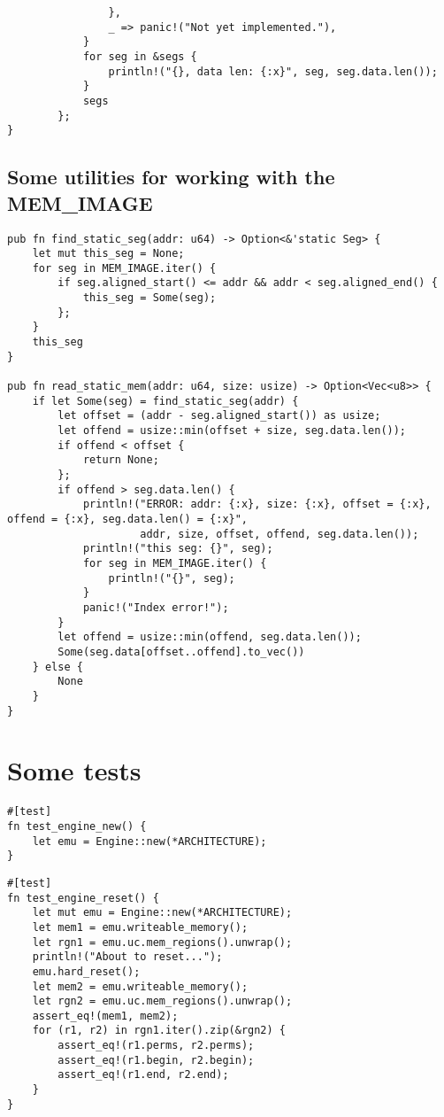 \documentclass[11pt]{article}
\begin{document}
\begin{lstlisting}
                },
                _ => panic!("Not yet implemented."),
            }
            for seg in &segs {
                println!("{}, data len: {:x}", seg, seg.data.len());
            }
            segs
        };
}
\end{lstlisting}

\subsection{Some utilities for working with the MEM\_IMAGE}
\label{sec:org6a36211}

\lstset{language=rust,label=orgfd2f05d,caption= ,captionpos=b,numbers=none}
\begin{lstlisting}
pub fn find_static_seg(addr: u64) -> Option<&'static Seg> {
    let mut this_seg = None;
    for seg in MEM_IMAGE.iter() {
        if seg.aligned_start() <= addr && addr < seg.aligned_end() {
            this_seg = Some(seg);
        };
    }
    this_seg
}

pub fn read_static_mem(addr: u64, size: usize) -> Option<Vec<u8>> {
    if let Some(seg) = find_static_seg(addr) {
        let offset = (addr - seg.aligned_start()) as usize;
        let offend = usize::min(offset + size, seg.data.len());
        if offend < offset {
            return None;
        };
        if offend > seg.data.len() {
            println!("ERROR: addr: {:x}, size: {:x}, offset = {:x}, offend = {:x}, seg.data.len() = {:x}",
                     addr, size, offset, offend, seg.data.len());
            println!("this seg: {}", seg);
            for seg in MEM_IMAGE.iter() {
                println!("{}", seg);
            }
            panic!("Index error!");
        }
        let offend = usize::min(offend, seg.data.len());
        Some(seg.data[offset..offend].to_vec())
    } else {
        None
    }
}
\end{lstlisting}

\section{Some tests}
\label{sec:org5b9c8f5}
\lstset{language=rust,label=orgae880f1,caption= ,captionpos=b,numbers=none}
\begin{lstlisting}
#[test]
fn test_engine_new() {
    let emu = Engine::new(*ARCHITECTURE);
}
\end{lstlisting}


\lstset{language=rust,label=org0f2de97,caption= ,captionpos=b,numbers=none}
\begin{lstlisting}
#[test]
fn test_engine_reset() {
    let mut emu = Engine::new(*ARCHITECTURE);
    let mem1 = emu.writeable_memory();
    let rgn1 = emu.uc.mem_regions().unwrap();
    println!("About to reset...");
    emu.hard_reset();
    let mem2 = emu.writeable_memory();
    let rgn2 = emu.uc.mem_regions().unwrap();
    assert_eq!(mem1, mem2);
    for (r1, r2) in rgn1.iter().zip(&rgn2) {
        assert_eq!(r1.perms, r2.perms);
        assert_eq!(r1.begin, r2.begin);
        assert_eq!(r1.end, r2.end);
    }
}
\end{lstlisting}
\end{document}
